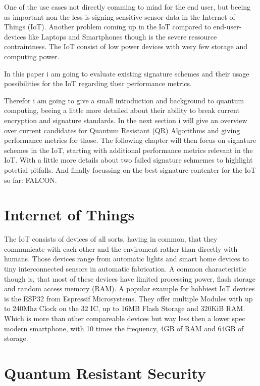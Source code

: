 \documentclass[conference]{IEEEtran}
\begin{document}
One of the use cases not directly comming to mind for the end user, but beeing as important non the less is signing sensitive sensor data in the Internet of Things (IoT).
Another problem coming up in the IoT compared to end-user-devices like Laptops and Smartphones though is the severe ressource contraintness. 
The IoT consist of low power devices with wery few storage and computing power.

In this paper i am going to evaluate existing signature schemes and their usage possibilities for the IoT regarding their performance metrics.

Therefor i am going to give a small introduction and background to quantum computing, beeing a little more detailed about their ability to break current encryption and signature standards.
In the next section i will give an overview over current candidates for Quantum Resistant (QR) Algorithms and giving performance metrics for those.
The following chapter will then focus on signature schemes in the IoT, starting with additional performance metrics relevant in the IoT.
With a little more details about two failed signature schmemes to highlight potetial pitfalls. 
And finally focussing on the best signature contenter for the IoT so far: FALCON.


\section{Internet of Things}
The IoT consists of devices of all sorts, having in common, that they communicate with each other and the enviroment rather than directly with humans.
Those devices range from automatic lights and smart home devices to tiny interconnected sensors in automatic fabrication.
A common characteristic though is, that most of these devices have limited processing power, flash storage and random access memory (RAM). 
A popular example for hobbiest IoT devices is the ESP32 from Espressif Microsystems.
They offer multiple Modules with up to 240Mhz Clock on the 32 IC, up to 16MB Flash Storage and 320KiB RAM.
Which is more than other compareable devices but way less then a lower spec modern smartphone, with 10 times the frequency, 4GB of RAM and 64GB of storage.


\section{Quantum Resistant Security}
\end{document}
